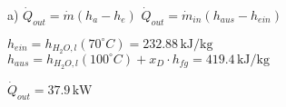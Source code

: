 a) \( \dot{Q}_{out} = \dot{m} (h_a - h_e) \)  
\( \dot{Q}_{out} = \dot{m}_{in} (h_{aus} - h_{ein}) \)  

\( h_{ein} = h_{H_2O,l} (70^\circ C) = 232.88 \, \text{kJ/kg} \)  
\( h_{aus} = h_{H_2O,l} (100^\circ C) + x_D \cdot h_{fg} = 419.4 \, \text{kJ/kg} \)  

\( \dot{Q}_{out} = 37.9 \, \text{kW} \)